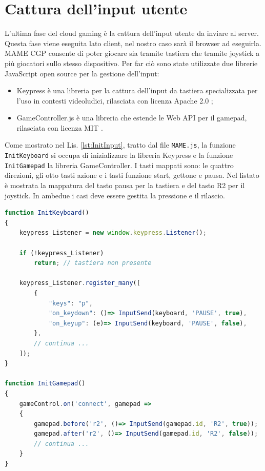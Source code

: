 \section{Cattura dell'input utente}
L'ultima fase del cloud gaming è la cattura dell'input utente da inviare al server. Questa fase viene eseguita lato client, nel nostro caso sarà il browser ad eseguirla. MAME CGP consente di poter giocare sia tramite tastiera che tramite joystick a più giocatori sullo stesso dispositivo. Per far ciò sono state utilizzate due librerie JavaScript open source per la gestione dell'input:

\begin{itemize}
	\item Keypress è una libreria per la cattura dell'input da tastiera specializzata per l'uso in contesti videoludici, rilasciata con licenza Apache 2.0 \parencite{Keypress};
	\item GameController.js è una libreria che estende le Web API per il gamepad, rilasciata con licenza MIT \parencite{gameController_js}.
\end{itemize}

Come mostrato nel Lis. \ref{lst:InitInput}, tratto dal file \verb|MAME.js|, la funzione \verb|InitKeyboard| si occupa di inizializzare la libreria Keypress e la funzione \verb|InitGamepad| la libreria GameController. I tasti mappati sono: le quattro direzioni, gli otto tasti azione e i tasti funzione start, gettone e pausa. Nel listato è mostrata la mappatura del tasto pausa per la tastiera e del tasto R2 per il joystick. In ambedue i casi deve essere gestita la pressione e il rilascio.

\begin{lstlisting}[language=JavaScript, caption=Codice relativo alla gestione input lato client. File: \detokenize{Streaming/HTML/MAME.js}, label={lst:InitInput}]
function InitKeyboard()
{
	keypress_Listener = new window.keypress.Listener();

	if (!keypress_Listener)
		return; // tastiera non presente

	keypress_Listener.register_many([
		{
			"keys": "p",
			"on_keydown": ()=> InputSend(keyboard, 'PAUSE', true),
			"on_keyup": (e)=> InputSend(keyboard, 'PAUSE', false),
		},
		// continua ...
	]);
}

function InitGamepad()
{
	gameControl.on('connect', gamepad =>
	{
		gamepad.before('r2', ()=> InputSend(gamepad.id, 'R2', true));
		gamepad.after('r2', ()=> InputSend(gamepad.id, 'R2', false));
		// continua ...
	}
}
\end{lstlisting}


